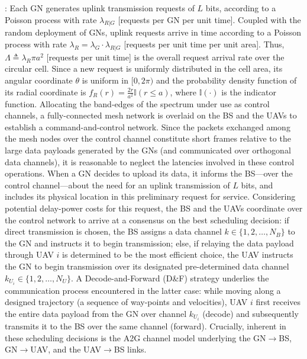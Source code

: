 \documentclass[10pt,twocolumn]{IEEEtran}
\begin{document}
: Each GN generates uplink transmission requests of $L$ bits, according to a Poisson process with rate $\lambda_{R{|}G}$ [requests per GN per unit time]. Coupled with the random deployment of GNs, uplink requests arrive in time according to a Poisson process with rate $\lambda_{R}{=}\lambda_{G}{\cdot}\lambda_{R{|}G}$ [requests per unit time per unit area]. Thus, $\Lambda{\triangleq}\lambda_{R}\pi a^{2}$ [requests per unit time] is the overall request arrival rate over the circular cell. Since a new request is uniformly distributed in the cell area, its angular coordinate $\theta$ is uniform in $[0,2\pi)$ and the probability density function of its radial coordinate is $f_{R}(r){=}\frac{2r}{a^2}\mathbb{I}(r{\leq}a)$, where $\mathbb{I}(\cdot)$ is the indicator function. Allocating the band-edges of the spectrum under use as control channels, a fully-connected mesh network is overlaid on the BS and the UAVs to establish a command-and-control network. Since the packets exchanged among the mesh nodes over the control channel constitute short frames relative to the large data payloads generated by the GNs (and communicated over orthogonal data channels), it is reasonable to neglect the latencies involved in these control operations. When a GN decides to upload its data, it informs the BS---over the control channel---about the need for an uplink transmission of $L$ bits, and includes its physical location in this preliminary request for service. Considering potential delay-power costs for this request, the BS and the UAVs coordinate over the control network to arrive at a consensus on the best scheduling decision: if direct transmission is chosen, the BS assigns a data channel $k{\in}\{1,2,{\dots},N_{B}\}$ to the GN and instructs it to begin transmission; else, if relaying the data payload through UAV $i$ is determined to be the most efficient choice, the UAV instructs the GN to begin transmission over its designated pre-determined data channel $k_{U_{i}}{\in}\{1,2,{\dots},N_{U}\}$. A Decode-and-Forward (D\&F) strategy underlies the communication process encountered in the latter case: while moving along a designed trajectory (a sequence of way-points and velocities), UAV $i$ first receives the entire data payload from the GN over channel $k_{U_{i}}$ (decode) and subsequently transmits it to the BS over the same channel (forward). Crucially, inherent in these scheduling decisions is the A2G channel model underlying the GN$\rightarrow$BS, GN$\rightarrow$UAV, and the UAV$\rightarrow$BS links.\\
\end{document}
